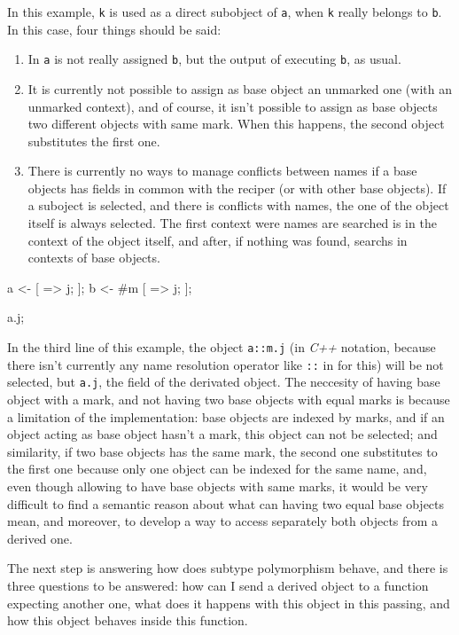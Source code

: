 \documentclass{article}
\begin{document}
In this example, \texttt{k} is used as a direct subobject of \texttt{a}, when
\texttt{k} really belongs to \texttt{b}. In this case, four things should be
said:

\begin{enumerate}
\item In \texttt{a} is not really assigned \texttt{b}, but the output of
  executing \texttt{b}, as usual.
\item It is currently not possible to assign as base object an unmarked one
  (with an unmarked context), and of course, it isn't possible to assign as
  base objects two different objects with same mark. When this happens, the
  second object substitutes the first one.
\item There is currently no ways to manage conflicts between names if a base
  objects has fields in common with the reciper (or with other base objects). If
  a suboject is selected, and there is conflicts with names, the one of the
  object itself is always selected. The first context were names are searched is
  in the context of the object itself, and after, if nothing was found, \faupp
  searchs in contexts of base objects.
\end{enumerate}

\begin{faupp2}
  a <- [ => j; ];
  b <- #m [ => j; ];

  a.j;
\end{faupp2}

In the third line of this example, the object \texttt{a::m.j} (in \textit{C++}
notation, because there isn't currently any name resolution operator like
\texttt{::} in \faupp for this) will be not selected, but \texttt{a.j}, the
field of the derivated object. The neccesity of having base object with a mark,
and not having two base objects with equal marks is because a limitation of the
implementation: base objects are indexed by marks, and if an object acting as
base object hasn't a mark, this object can not be selected; and similarity, if
two base objects has the same mark, the second one substitutes to the first one
because only one object can be indexed for the same name, and, even though
allowing to have base objects with same marks, it would be very difficult to
find a semantic reason about what can having two equal base objects mean, and
moreover, to develop a way to access separately both objects from a derived one.

The next step is answering how does subtype polymorphism behave, and there is
three questions to be answered: how can I send a derived object to a function
expecting another one, what does it happens with this object in this passing,
and how this object behaves inside this function.
\end{document}
